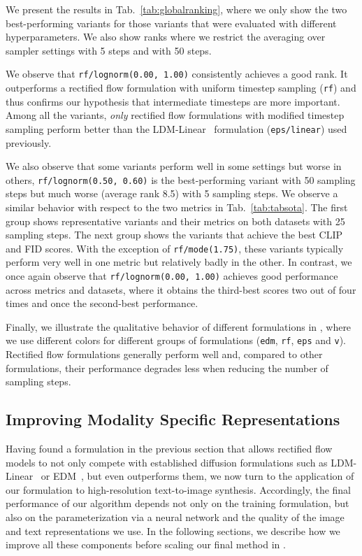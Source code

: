 We present the results in Tab.~\ref{tab:globalranking}, where we only show the
two best-performing variants for those variants that were evaluated with different
hyperparameters. We also show ranks where we restrict the averaging over
sampler settings with 5 steps and with 50 steps.

We observe that \texttt{rf/lognorm(0.00, 1.00)} consistently achieves a good
rank. It outperforms a rectified flow formulation with uniform timestep
sampling (\texttt{rf}) and thus confirms our hypothesis that
intermediate timesteps are more important. Among all the variants, \emph{only}
rectified flow formulations with modified timestep sampling perform better than
the LDM-Linear~\citep{Rombach_2022} formulation (\texttt{eps/linear}) used previously.

We also observe that some variants perform well in some settings but worse in
others, \eg \texttt{rf/lognorm(0.50, 0.60)} is the best-performing variant with
50 sampling steps but much worse (average rank 8.5) with 5 sampling steps. We
observe a similar behavior with respect to the two metrics in
Tab.~\ref{tab:tabsota}. The first group shows representative variants and their
metrics on both datasets with 25 sampling steps. The next group shows the
variants that achieve the best CLIP and
FID scores. With the exception of \texttt{rf/mode(1.75)}, these
variants typically perform very well in one metric but relatively badly
in the other. In contrast, we once again observe that \texttt{rf/lognorm(0.00,
1.00)} achieves good performance across metrics and datasets, where it obtains
the third-best scores two out of four times and once the second-best
performance.

Finally, we illustrate the qualitative behavior of different formulations in
, where we use different colors for different groups
of formulations (\textcolor[HTML]{d95f02}{\texttt{edm}},
\textcolor[HTML]{1b9e77}{\texttt{rf}}, \textcolor[HTML]{7570b3}{\texttt{eps}}
and \textcolor[HTML]{e7298a}{\texttt{v}}).
Rectified flow formulations generally perform well and, compared to other
formulations, their performance degrades less when reducing the number of
sampling steps.

\figfidvssteps

\subsection{Improving Modality Specific Representations}
\label{subsec:modalityspecifics}
Having found a formulation in the previous section that allows rectified flow models to not only 
compete with established diffusion formulations such as LDM-Linear~\citep{Rombach_2022} 
or EDM~\citep{Karras2022ElucidatingTD}, but even outperforms them, 
we now turn to the application of our formulation to high-resolution text-to-image synthesis. 
Accordingly, the final performance of our algorithm depends not only 
on the training formulation, but also on the parameterization via a neural network
and the quality of the image and text representations we use. 
In the following sections, we describe how we improve all these components before scaling our final method in . 

